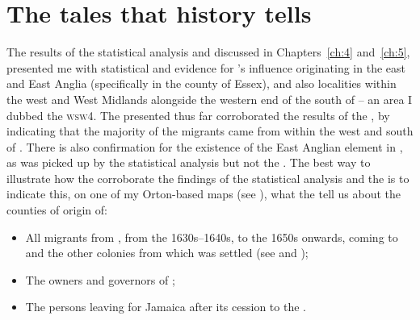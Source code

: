 \section{The tales that history tells} \label{6.3}
The results of the statistical analysis and  discussed in Chapters~\ref{ch:4} and~\ref{ch:5}, presented me with statistical and  evidence for 's  influence originating in the east and East Anglia (specifically in the county of Essex), and also localities within the west and West Midlands alongside the western end of the south of  -- an area I dubbed the \textsc{wsw4}. The  presented thus far corroborated the results of the , by indicating that the majority of the migrants came from within the west and south of . There is also confirmation for the existence of the East Anglian element in , as was picked up by the statistical analysis but not the . The best way to illustrate how the  corroborate the findings of the statistical analysis and the  is to indicate this, on one of my Orton-based maps (see ), what the  tell us about the counties of origin of:

\begin{itemize}
\item{All migrants from , from the 1630s--1640s, to the 1650s onwards, coming to  and the other colonies from which  was settled (see  and );}
\item{The owners and governors of ;}
\item{The persons leaving  for Jamaica after its cession to the .}
\end{itemize}


